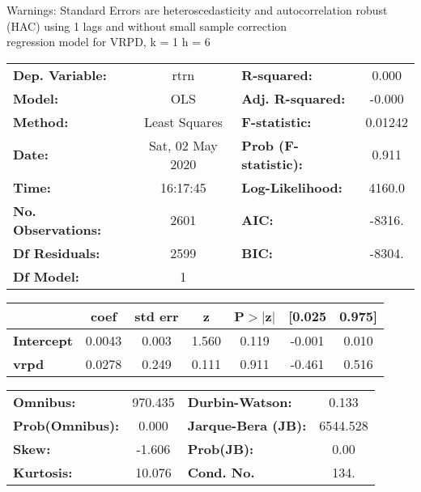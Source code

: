 Warnings: \newline
 [1] Standard Errors are heteroscedasticity and autocorrelation robust (HAC) using 1 lags and without small sample correction\\ 

regression model for VRPD, k = 1 h = 6\begin{center}
\begin{tabular}{lclc}
\toprule
\textbf{Dep. Variable:}    &       rtrn       & \textbf{  R-squared:         } &     0.000   \\
\textbf{Model:}            &       OLS        & \textbf{  Adj. R-squared:    } &    -0.000   \\
\textbf{Method:}           &  Least Squares   & \textbf{  F-statistic:       } &   0.01242   \\
\textbf{Date:}             & Sat, 02 May 2020 & \textbf{  Prob (F-statistic):} &    0.911    \\
\textbf{Time:}             &     16:17:45     & \textbf{  Log-Likelihood:    } &    4160.0   \\
\textbf{No. Observations:} &        2601      & \textbf{  AIC:               } &    -8316.   \\
\textbf{Df Residuals:}     &        2599      & \textbf{  BIC:               } &    -8304.   \\
\textbf{Df Model:}         &           1      & \textbf{                     } &             \\
\bottomrule
\end{tabular}
\begin{tabular}{lcccccc}
                   & \textbf{coef} & \textbf{std err} & \textbf{z} & \textbf{P$> |$z$|$} & \textbf{[0.025} & \textbf{0.975]}  \\
\midrule
\textbf{Intercept} &       0.0043  &        0.003     &     1.560  &         0.119        &       -0.001    &        0.010     \\
\textbf{vrpd}      &       0.0278  &        0.249     &     0.111  &         0.911        &       -0.461    &        0.516     \\
\bottomrule
\end{tabular}
\begin{tabular}{lclc}
\textbf{Omnibus:}       & 970.435 & \textbf{  Durbin-Watson:     } &    0.133  \\
\textbf{Prob(Omnibus):} &   0.000 & \textbf{  Jarque-Bera (JB):  } & 6544.528  \\
\textbf{Skew:}          &  -1.606 & \textbf{  Prob(JB):          } &     0.00  \\
\textbf{Kurtosis:}      &  10.076 & \textbf{  Cond. No.          } &     134.  \\
\bottomrule
\end{tabular}
\end{center}

